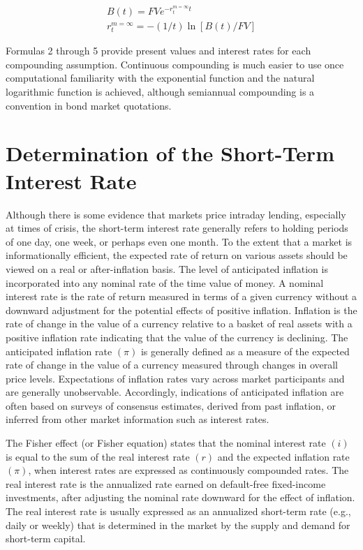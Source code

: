 \documentclass[11pt]{article}
\begin{document}
\begin{gather*}
B(t)=F V e^{-r_{t}^{m=\infty} t}  \tag{4}\\
r_{t}^{m=\infty}=-(1 / t) \ln [B(t) / F V] \tag{5}
\end{gather*}


Formulas 2 through 5 provide present values and interest rates for each compounding assumption. Continuous compounding is much easier to use once computational familiarity with the exponential function and the natural logarithmic function is achieved, although semiannual compounding is a convention in bond market quotations.

\section*{Determination of the Short-Term Interest Rate}
Although there is some evidence that markets price intraday lending, especially at times of crisis, the short-term interest rate generally refers to holding periods of one day, one week, or perhaps even one month. To the extent that a market is informationally efficient, the expected rate of return on various assets should be viewed on a real or after-inflation basis. The level of anticipated inflation is incorporated into any nominal rate of the time value of money. A nominal interest rate is the rate of return measured in terms of a given currency without a downward adjustment for the potential effects of positive inflation. Inflation is the rate of change in the value of a currency relative to a basket of real assets with a positive inflation rate indicating that the value of the currency is declining. The anticipated inflation rate $(\pi)$ is generally defined as a measure of the expected rate of change in the value of a currency measured through changes in overall price levels. Expectations of inflation rates vary across market participants and are generally unobservable. Accordingly, indications of anticipated inflation are often based on surveys of consensus estimates, derived from past inflation, or inferred from other market information such as interest rates.

The Fisher effect (or Fisher equation) states that the nominal interest rate $(i)$ is equal to the sum of the real interest rate $(r)$ and the expected inflation rate $(\pi)$, when interest rates are expressed as continuously compounded rates. The real interest rate is the annualized rate earned on default-free fixed-income investments, after adjusting the nominal rate downward for the effect of inflation. The real interest rate is usually expressed as an annualized short-term rate (e.g., daily or weekly) that is determined in the market by the supply and demand for short-term capital.
\end{document}
